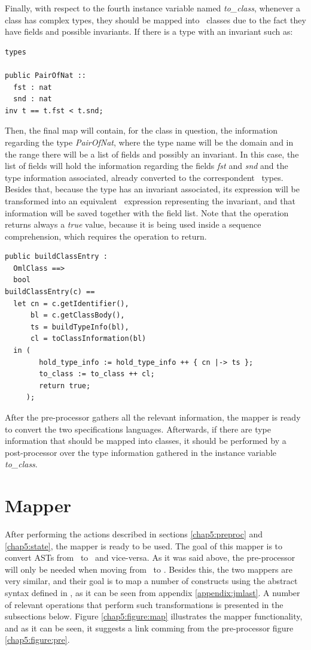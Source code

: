 Finally, with respect to the fourth instance variable named \textit{to\_class}, whenever a class has complex types, they should be mapped into \jml\ classes due to the fact they have fields and possible invariants. If there is a type with an invariant such as:
\lstset{style=AST}
\bigskip
\begin{lstlisting}
types

public PairOfNat ::
  fst : nat
  snd : nat
inv t == t.fst < t.snd;
\end{lstlisting}
\bigskip

Then, the final map will contain, for the class in question, the information regarding the type \textit{PairOfNat}, where the type name will be the domain and in the range there will be a list of fields and possibly an invariant. In this case, the list of fields will hold the information regarding the fields \textit{fst} and \textit{snd} and the type information associated, already converted to the correspondent \jml\ types. Besides that, because the type has an invariant associated, its expression will be transformed into an equivalent \jml\ expression representing the invariant, and that information will be saved together with the field list. Note that the operation returns always a \textit{true} value, because it is being used inside a sequence comprehension, which requires the operation to return.
\lstset{style=mystyle}
\lstset{language=VDM++}
\bigskip
\begin{lstlisting}
public buildClassEntry :
  OmlClass ==>
  bool
buildClassEntry(c) ==
  let cn = c.getIdentifier(),
      bl = c.getClassBody(),
      ts = buildTypeInfo(bl),
      cl = toClassInformation(bl)
  in (
        hold_type_info := hold_type_info ++ { cn |-> ts };
        to_class := to_class ++ cl;
        return true;
     );
\end{lstlisting}
\bigskip

After the pre-processor gathers all the relevant information, the mapper is ready to convert the two specifications languages. Afterwards, if there are type information that should be mapped into classes, it should be performed by a post-processor over the type information gathered in the instance variable \textit{to\_class}.

\section{Mapper}
\label{chap5:mapper}

After performing the actions described in sections \ref{chap5:preproc} and \ref{chap5:state}, the mapper is ready to be used. The goal of this mapper is to convert ASTs from \jml\ to \vpp\ and vice-versa. As it was said above, the pre-processor will only be needed when moving from \vpp\ to \jml. Besides this, the two mappers are very similar, and their goal is to map a number of constructs using the abstract syntax defined in \vdm, as it can be seen from appendix \ref{appendix:jmlast}. A number of relevant operations that perform such transformations is presented in the subsections below. Figure \ref{chap5:figure:map} illustrates the mapper functionality, and as it can be seen, it suggests a link comming from the pre-processor figure \ref{chap5:figure:pre}.

